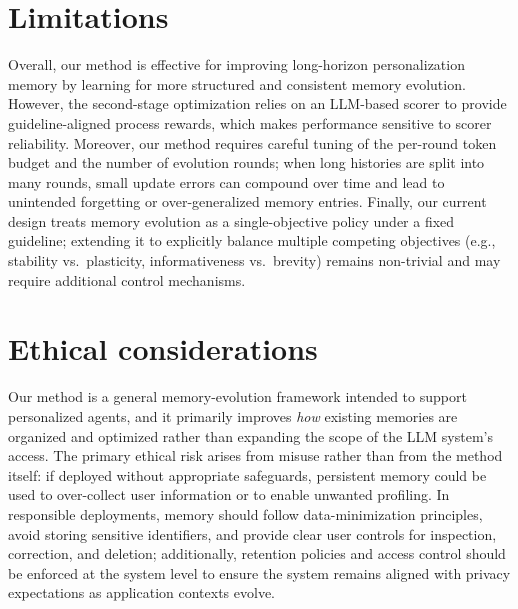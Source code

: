 \section*{Limitations}
Overall, our method is effective for improving long-horizon personalization memory by learning for more structured and consistent memory evolution. However, the second-stage optimization relies on an LLM-based scorer to provide guideline-aligned process rewards, which makes performance sensitive to scorer reliability. Moreover, our method requires careful tuning of the per-round token budget and the number of evolution rounds; when long histories are split into many rounds, small update errors can compound over time and lead to unintended forgetting or over-generalized memory entries. Finally, our current design treats memory evolution as a single-objective policy under a fixed guideline; extending it to explicitly balance multiple competing objectives (e.g., stability vs.\ plasticity, informativeness vs.\ brevity) remains non-trivial and may require additional control mechanisms.

\section*{Ethical considerations}
Our method is a general memory-evolution framework intended to support personalized agents, and it primarily improves \emph{how} existing memories are organized and optimized rather than expanding the scope of the LLM system's access. The primary ethical risk arises from misuse rather than from the method itself: if deployed without appropriate safeguards, persistent memory could be used to over-collect user information or to enable unwanted profiling. In responsible deployments, memory should follow data-minimization principles, avoid storing sensitive identifiers, and provide clear user controls for inspection, correction, and deletion; additionally, retention policies and access control should be enforced at the system level to ensure the system remains aligned with privacy expectations as application contexts evolve.

